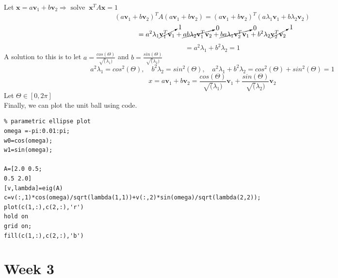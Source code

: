 \documentclass[12pt]{article}
\newcounter{lecture}[section] %
\begin{document}
Let $\mathbf{x} = a\mathbf{v}_1 + b\mathbf{v}_2 \Rightarrow \text{ solve } \: \mathbf{x}^T A \mathbf{x} = 1$
\begin{equation*}
    (a\mathbf{v}_1 + b\mathbf{v}_2)^TA(a\mathbf{v}_1 + b\mathbf{v}_2) = (a\mathbf{v}_1 + b\mathbf{v}_2)^T (a\lambda_1\mathbf{v}_1 + b \lambda_2 \mathbf{v}_2)
\end{equation*}
\begin{equation*}
    = a^2 \lambda_1 \cancelto{1}{\mathbf{v}_1^T\mathbf{v}_1} + \cancelto{0}{ab\lambda_2\mathbf{v}_1^T \mathbf{v}_2} + \cancelto{0}{ba \lambda_1 \mathbf{v}_2^T\mathbf{v}_1} + b^2 \lambda_2 \cancelto{1}{\mathbf{v}_2^T\mathbf{v}_2}
\end{equation*}
\begin{equation*}
    = \boxed{a^2 \lambda_1  + b^2 \lambda_2 = 1}
\end{equation*}
A solution to this is to let $a = \frac{cos(\Theta)}{\sqrt(\lambda_1)}$ and $b = \frac{sin(\Theta)}{\sqrt(\lambda_2)}$ 
\begin{equation*}
    a^2 \lambda_1 = cos^2(\Theta), \quad b^2 \lambda_2 = sin^2(\Theta), \quad a^2 \lambda_1 + b^2 \lambda_2 = cos^2(\Theta) + sin^2(\Theta) = 1
\end{equation*}
\begin{equation*}
    x = a\mathbf{v}_1 + b\mathbf{v}_2 = \frac{cos(\Theta)}{\sqrt(\lambda_1)}\mathbf{v}_1 + \frac{sin(\Theta)}{\sqrt(\lambda_2)}\mathbf{v}_2
\end{equation*}
Let $\Theta \in [0, 2\pi]$ \\
Finally, we can plot the unit ball using code.
\begin{lstlisting}
% parametric ellipse plot 
omega =-pi:0.01:pi;
w0=cos(omega);
w1=sin(omega);

A=[2.0 0.5;
0.5 2.0]
[v,lambda]=eig(A)
c=v(:,1)*cos(omega)/sqrt(lambda(1,1))+v(:,2)*sin(omega)/sqrt(lambda(2,2));
plot(c(1,:),c(2,:),'r')
hold on
grid on;
fill(c(1,:),c(2,:),'b')
\end{lstlisting}

\newpage

\section*{Week 3}
\end{document}
